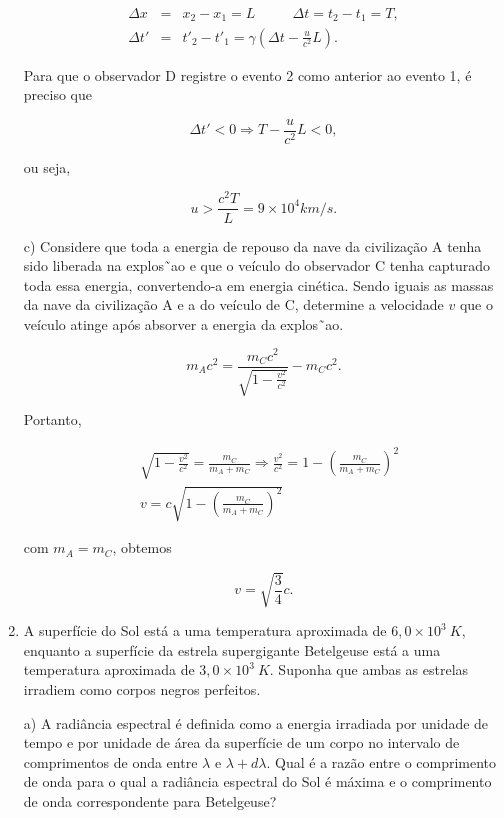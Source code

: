 \begin{enumerate}[start=1,label={\bfseries Q\arabic*.}]
{    \begin{eqnarray*}
      \Delta x &=& x_{2} - x_{1} = L \quad \ \ \ \quad \Delta t = t_{2} - t_{1} = T, \\
      \Delta t' &=& t'_{2} - t'_{1} = \gamma \left(  \Delta t - \frac{u}{c^{2}} L \right).
    \end{eqnarray*}

    Para que o observador D registre o evento 2 como anterior ao evento 1, é preciso que

     $$
     \Delta t' < 0 \Rightarrow T - \frac{u}{c^{2}} L < 0,
     $$

    ou seja,

    $$
    u > \frac{c^{2}T}{L} = 9 \times 10^{4} km/s.
    $$

    }


c) Considere que toda a energia de repouso da nave da civilização A tenha sido liberada na explos˜ao e que o veículo do observador C tenha capturado toda essa energia, convertendo-a em energia cinética. Sendo iguais as massas da nave da civilização A e a do veículo de C, determine a velocidade $v$ que o veículo atinge após absorver a energia da explos˜ao.

{\color{red}

$$
m_{A} c^{2} = \frac{m_{C} c^{2}}{\sqrt{1-\frac{v^{2}}{c^{2}}}} - m_{C} c^{2}.
$$

Portanto,


$$
\begin{aligned}
& \sqrt{1-\frac{v^{2}}{c^{2}}}=\frac{m_{C}}{m_{A}+m_{C}} \Rightarrow \frac{v^{2}}{c^{2}} = 1-\left(\frac{m_{C}}{m_{A}+m_{C}}\right)^{2}\\
& v = c \sqrt{1 - \left(\frac{m_{C}}{m_{A}+m_{C}} \right)^{2}}
\end{aligned}
$$

com $m_{A} = m_{C}$, obtemos

$$
v = \sqrt{\frac{3}{4}}c.
$$

}








\item A superfície do Sol está a uma temperatura aproximada de $6,0 \times 10^{3} \ K$, enquanto a superfície da estrela supergigante Betelgeuse está a uma temperatura aproximada de $3,0 \times 10^{3} \ K$. Suponha que ambas as estrelas irradiem como corpos negros perfeitos.


  a) A radiância espectral é definida como a energia irradiada por unidade de tempo e por unidade de área da superfície de um corpo no intervalo de comprimentos de onda entre $\lambda$ e $\lambda + d\lambda$. Qual é a razão entre o comprimento de onda para o qual a radiância espectral do Sol é máxima e o comprimento de onda correspondente para Betelgeuse?


\end{enumerate}
